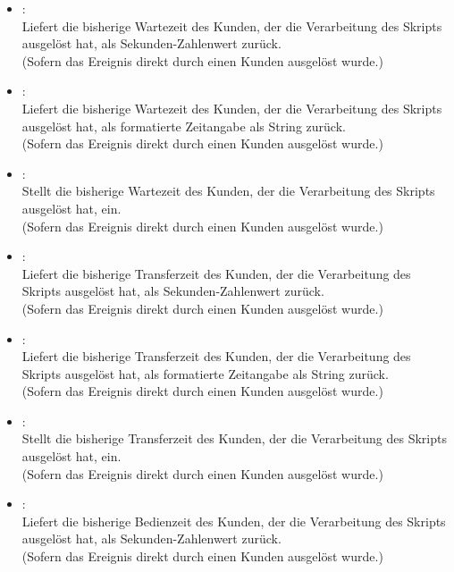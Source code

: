 \begin{itemize}
\item
{}:\\
Liefert die bisherige Wartezeit des Kunden, der die Verarbeitung des Skripts ausgelöst hat, als Sekunden-Zahlenwert zurück.\\
(Sofern das Ereignis direkt durch einen Kunden ausgelöst wurde.)

\item
{}:\\
Liefert die bisherige Wartezeit des Kunden, der die Verarbeitung des Skripts ausgelöst hat, als formatierte Zeitangabe als String zurück.\\
(Sofern das Ereignis direkt durch einen Kunden ausgelöst wurde.)

\item
{}:\\
Stellt die bisherige Wartezeit des Kunden, der die Verarbeitung des Skripts ausgelöst hat, ein.\\
(Sofern das Ereignis direkt durch einen Kunden ausgelöst wurde.)

\item
{}:\\
Liefert die bisherige Transferzeit des Kunden, der die Verarbeitung des Skripts ausgelöst hat, als Sekunden-Zahlenwert zurück.\\
(Sofern das Ereignis direkt durch einen Kunden ausgelöst wurde.)

\item
{}:\\
Liefert die bisherige Transferzeit des Kunden, der die Verarbeitung des Skripts ausgelöst hat, als formatierte Zeitangabe als String zurück.\\
(Sofern das Ereignis direkt durch einen Kunden ausgelöst wurde.)

\item
{}:\\
Stellt die bisherige Transferzeit des Kunden, der die Verarbeitung des Skripts ausgelöst hat, ein.\\
(Sofern das Ereignis direkt durch einen Kunden ausgelöst wurde.)

\item
{}:\\
Liefert die bisherige Bedienzeit des Kunden, der die Verarbeitung des Skripts ausgelöst hat, als Sekunden-Zahlenwert zurück.\\
(Sofern das Ereignis direkt durch einen Kunden ausgelöst wurde.)


\end{itemize}
